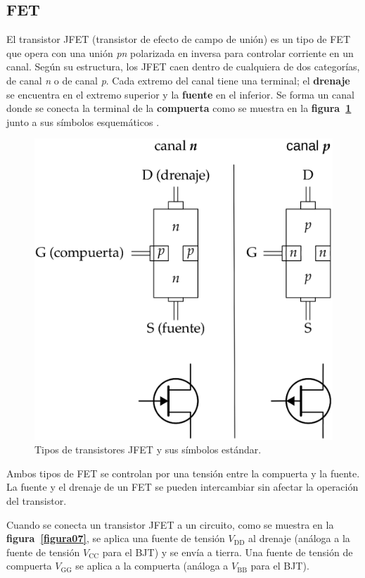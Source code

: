 \subsection{FET}
El transistor JFET (transistor de efecto de campo de unión) es un tipo de FET
que opera con una unión \emph{pn} polarizada en inversa para controlar corriente
en un canal. Según su estructura, los JFET caen dentro de cualquiera de dos
categorías, de canal \emph{n} o de canal \emph{p}. Cada extremo del canal tiene
una terminal; el \textbf{drenaje} se encuentra en el extremo superior y la
\textbf{fuente} en el inferior. Se forma un canal donde se conecta la terminal
de la \textbf{compuerta} como se muestra en la \textbf{figura~\ref{figura06}}
junto a sus símbolos esquemáticos \cite{Floyd}.

\begin{figure}[!ht]
\centering
\includegraphics[scale=0.30]{diagramas/figura06.eps}
\caption{Tipos de transistores JFET y sus símbolos estándar.}
\label{figura06}
\end{figure}

Ambos tipos de FET se controlan por una tensión entre la compuerta y la fuente.
La fuente y el drenaje de un FET se pueden intercambiar sin afectar la operación
del transistor.

Cuando se conecta un transistor JFET a un circuito, como se muestra en la
\textbf{figura~\ref{figura07}}, se aplica una fuente de tensión $V_{\text{DD}}$
al drenaje (análoga a la fuente de tensión $V_{\text{CC}}$ para el BJT) y se
envía a tierra. Una fuente de tensión de compuerta $V_{\text{GG}}$ se aplica a
la compuerta (análoga a $V_{\text{BB}}$ para el BJT).

